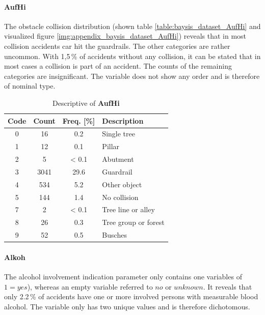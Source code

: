 \pagebreak

\paragraph{AufHi}
\label{baysis_dataset_AufHi}
The obstacle collision distribution (shown table \autoref{table:baysis_dataset_AufHi} and visualized figure \autoref{img:appendix_baysis_dataset_AufHi}) reveals that in most collision accidents car hit the guardrails. The other categories are rather uncommon. With 1,5\,\% of accidents without any collision, it can be stated that in most cases a collision is part of an accident. The counts of the remaining categories are insignificant. The variable does not show any order and is therefore of nominal type.
\begin{table}[ht]
	\centering
	\small
	\begin{tabular}{c|c|c|l} 
		\toprule
		Code & Count & Freq. [\%] & Description \\ 
		\midrule 
		0 & 16 		& 0.2	& Single tree \\
		1 & 12 		& 0.1	& Pillar \\
		2 & 5 		& < 0.1	& Abutment \\
		3 & 3041	& 29.6	& Guardrail \\
		4 & 534		& 5.2	& Other object \\
		5 & 144		& 1.4	& No collision \\
		7 & 2		& < 0.1	& Tree line or alley \\
		8 & 26		& 0.3	& Tree group or forest \\
		9 & 52		& 0.5	& Busches \\
		\bottomrule
	\end{tabular}
	\caption{Descriptive of \textbf{AufHi}}
	\label{table:baysis_dataset_AufHi}
	\vspace{-8mm}
\end{table}

\paragraph{Alkoh}
\label{baysis_dataset_Alkoh}
The alcohol involvement indication parameter only contains one variables of $1 = yes$), whereas an empty variable referred to $no$ or $unknown$. It reveals that only 2.2\,\% of accidents have one or more involved persons with measurable blood alcohol. The variable only has two unique values and is therefore dichotomous.

